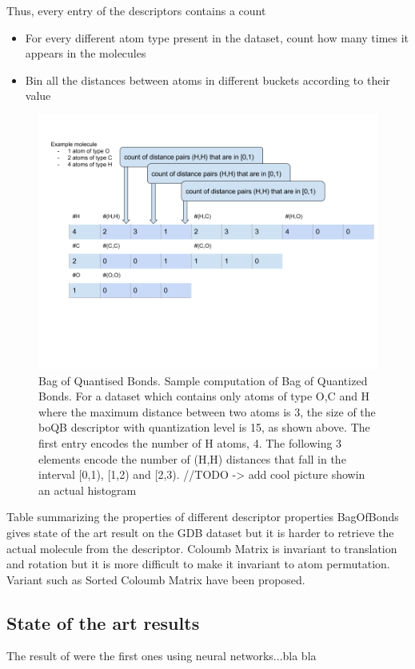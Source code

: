 \documentclass{article}
\begin{document}
Thus, every entry of the descriptors contains a count
\begin{itemize}
\item 
For every different atom type present in the dataset, count how many times it appears in the molecules
\item  
Bin all the distances between atoms in different buckets according to their value
\end{itemize}


\begin{figure}[h!]
\centering
\includegraphics[scale=0.5]{HistogramOfDistances.png}
\caption{Bag of Quantised Bonds.
Sample computation of Bag of Quantized Bonds. For a dataset which contains only atoms of type O,C and H where the maximum distance between two atoms is 3, the size of the boQB descriptor with quantization level is 15, as shown above. The first entry encodes the number of H atoms, 4. The following 3 elements encode the number of (H,H) distances that fall in the interval [0,1), [1,2) and [2,3).
//TODO -> add cool picture showin an actual histogram
}
\label{fig:univerise}
\end{figure}

Table summarizing the properties of different descriptor properties
BagOfBonds gives state of the art result on the GDB dataset
but it is harder to retrieve the actual molecule from the descriptor. Coloumb Matrix is invariant to translation and rotation but it is more difficult to make it invariant to atom permutation. Variant such as Sorted Coloumb Matrix have been proposed.

\subsection{State of the art results}
The result of \cite{montavon2012learning} were the first ones using neural networks...bla bla
\end{document}

